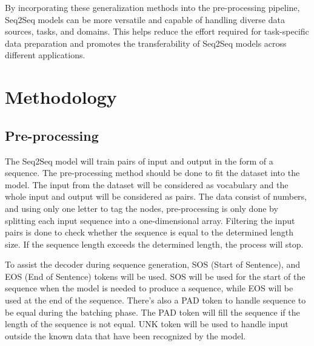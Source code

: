\documentclass[conference]{IEEEtran}
\begin{document}




By incorporating these generalization methods into the pre-processing pipeline, Seq2Seq models can be more versatile and capable of handling diverse data sources, tasks, and domains. This helps reduce the effort required for task-specific data preparation and promotes the transferability of Seq2Seq models across different applications.


\section{Methodology}

\subsection{Pre-processing}



The Seq2Seq model will train pairs of input and output in the form of a sequence. The pre-processing method should be done to fit the dataset into the model. The input from the dataset will be considered as vocabulary and the whole input and output will be considered as pairs. The data consist of numbers, and using only one letter to tag the nodes, pre-processing is only done by splitting each input sequence into a one-dimensional array. Filtering the input pairs is done to check whether the sequence is equal to the determined length size. If the sequence length exceeds the determined length, the process will stop.

To assist the decoder during sequence generation, SOS (Start of Sentence), and EOS (End of Sentence) tokens will be used. SOS will be used for the start of the sequence when the model is needed to produce a sequence, while EOS will be used at the end of the sequence. There's also a PAD token to handle sequence to be equal during the batching phase. The PAD token will fill the sequence if the length of the sequence is not equal. UNK token will be used to handle input outside the known data that have been recognized by the model.
\end{document}
